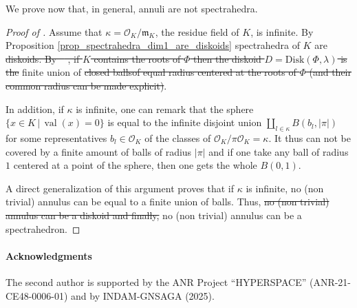 \documentclass[sigconf]{acmart}
\DeclareMathOperator{\val}{val}
\newcommand{\OK}{\mathcal{O}_K}
\providecommand{\DIFaddtex}[1]{{\protect\color{blue}\uwave{#1}}} %
\providecommand{\DIFdeltex}[1]{{\protect\color{red}\sout{#1}}}                      %
\providecommand{\DIFaddbegin}{} %
\providecommand{\DIFaddend}{} %
\providecommand{\DIFdelbegin}{} %
\providecommand{\DIFdelend}{} %
\providecommand{\DIFadd}[1]{\texorpdfstring{\DIFaddtex{#1}}{#1}} %
\providecommand{\DIFdel}[1]{\texorpdfstring{\DIFdeltex{#1}}{}} %
\newcommand{\DIFscaledelfig}{0.5}
\newlength{\DIFdelgraphicswidth} %
\newlength{\DIFdelgraphicsheight} %
\newcommand{\DIFaddincludegraphics}[2][]{{\color{blue}\fbox{\DIFOincludegraphics[#1]{#2}}}} %
\newcommand{\DIFdelincludegraphics}[2][]{%
\sbox{\DIFdelgraphicsbox}{\DIFOincludegraphics[#1]{#2}}%
\settoboxwidth{\DIFdelgraphicswidth}{\DIFdelgraphicsbox} %
\settoboxtotalheight{\DIFdelgraphicsheight}{\DIFdelgraphicsbox} %
\scalebox{\DIFscaledelfig}{%
\parbox[b]{\DIFdelgraphicswidth}{\usebox{\DIFdelgraphicsbox}\\[-\baselineskip] \rule{\DIFdelgraphicswidth}{0em}}\llap{\resizebox{\DIFdelgraphicswidth}{\DIFdelgraphicsheight}{%
\setlength{\unitlength}{\DIFdelgraphicswidth}%
\begin{picture}(1,1)%
\thicklines\linethickness{2pt} %
{\color[rgb]{1,0,0}\put(0,0){\framebox(1,1){}}}%
{\color[rgb]{1,0,0}\put(0,0){\line( 1,1){1}}}%
{\color[rgb]{1,0,0}\put(0,1){\line(1,-1){1}}}%
\end{picture}%
}\hspace*{3pt}}} %
} %
\DeclareRobustCommand{\DIFaddbegin}{\DIFOaddbegin \let\includegraphics\DIFaddincludegraphics} %
\DeclareRobustCommand{\DIFaddend}{\DIFOaddend \let\includegraphics\DIFOincludegraphics} %
\DeclareRobustCommand{\DIFdelbegin}{\DIFOdelbegin \let\includegraphics\DIFdelincludegraphics} %
\DeclareRobustCommand{\DIFdelend}{\DIFOaddend \let\includegraphics\DIFOincludegraphics} %
\begin{document}
We prove now that, in general, annuli are not spectrahedra.

\begin{proof}[{Proof of }]
Assume that $\kappa = \OK/\mathfrak{m}_K$, the residue field of $K$, is infinite.
By Proposition \ref{prop_spectrahedra_dim1_are_diskoids} spectrahedra of $K$ are \DIFdelbegin \DIFdel{diskoids.
By \mbox{%
\cite[Lemma 4.43]{ruth_models_2015}}\hskip0pt%
, if $K$
contains the roots of $\Phi$ then the diskoid
$D=\textrm{Disk}(\Phi, \lambda)$ is the }\DIFdelend finite union of \DIFdelbegin \DIFdel{closed ballsof equal radius centered at the roots of $\Phi$ (and their common radius can be made explicit)}\DIFdelend \DIFaddbegin \DIFadd{balls}\DIFaddend .

In addition, if $\kappa$ is infinite, one can remark that the sphere
$\{x \in K \,|\,  \val(x) =0\}$ is equal to the infinite disjoint union $\amalg_{l \in \kappa} B(b_l, \vert \pi \vert)$ for some representatives $b_l \in \OK$ of the classes of $\OK / \pi\OK = \kappa.$
It thus can not be covered by a finite amount of balls of radius $\vert \pi \vert$
and if one take any ball of radius $1$ centered at a point of the sphere, then one gets the whole
$B(0,1).$

A direct generalization of this argument proves that
if $\kappa$ is infinite, no (non trivial) annulus can be equal to
a finite union of balls. Thus, \DIFdelbegin \DIFdel{no (non trivial) annulus can be a diskoid and finally, }\DIFdelend \DIFaddbegin \DIFadd{by Prop. \ref{prop_spectrahedra_dim1_are_diskoids} }\DIFaddend no (non trivial) annulus can be a spectrahedron.
\end{proof}



\paragraph*{Acknowledgments}
The second author is supported by the ANR Project ``HYPERSPACE'' (ANR-21-CE48-0006-01)
and by INDAM-GNSAGA (2025).



\end{document}
